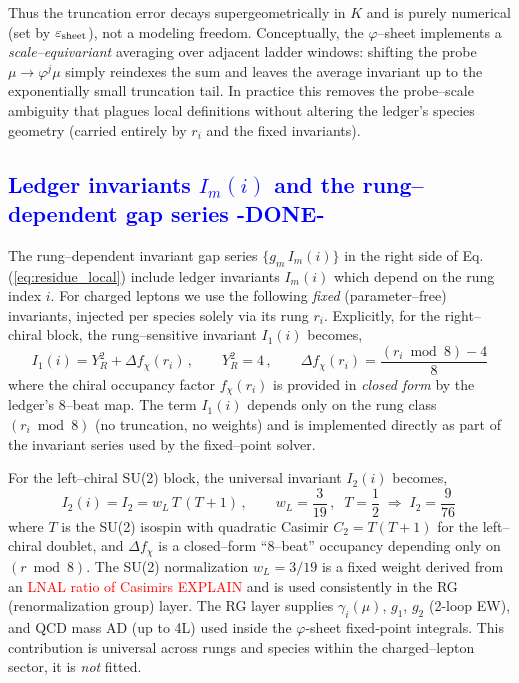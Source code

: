 \documentclass[%
 amsmath,amssymb,
 aps,
prb,
floatfix, showkeys
]{revtex4-2}
\newcommand{\need}[1]{\textcolor{red}{#1}}
\newcommand{\modif}[1]{\textcolor{blue}{#1}}
\begin{document}
Thus the truncation error decays supergeometrically in $K$ and is purely numerical
(set by $\varepsilon_{\rm sheet}$), not a modeling freedom.
Conceptually, the $\varphi$--sheet implements a \emph{scale–equivariant} averaging over
adjacent ladder windows: shifting the probe $\mu\!\to\!\varphi^j\mu$ simply reindexes
the sum and leaves the average invariant up to the exponentially small truncation tail.
In practice this removes the probe--scale ambiguity that plagues local definitions without
altering the ledger’s species geometry (carried entirely by $r_i$ and the fixed invariants).















{\modif{
\subsection{Ledger invariants $I_m(i)$ and the rung–dependent gap series  -DONE-}
\label{subsec:ledger-invariants}
}}
The rung--dependent invariant gap series
$\{g_m\,I_m(i)\}$ in the right side of
Eq.(\ref{eq:residue_local}) include ledger invariants $I_m(i)$ which depend on the
rung index $i$. 
For charged leptons we use the following \emph{fixed} (parameter–free) invariants,
injected per species solely via its rung $r_i$.
Explicitly, for the right--chiral block, the rung--sensitive 
invariant $I_1(i)$  becomes,
\begin{equation}
  I_1(i) =  Y_R^2  + \Delta f_\chi(r_i) \, , \qquad Y_R^2 = 4  \,, \qquad 
  \Delta f_\chi(r_i) = \frac{(r_i\bmod 8) - 4}{8} 
  \label{eq:I1_def}
\end{equation}
where the chiral occupancy factor $f_\chi(r_i)$ is provided in \emph{closed form}
by the ledger’s 8--beat map.
The term  $I_1(i)$ depends only on the rung class $(r_i\bmod 8)$
(no truncation, no weights) and is implemented directly as part of
the invariant series used by the fixed--point solver.


For the left--chiral SU(2) block, the universal invariant $I_2(i)$ becomes, 
\begin{equation}
  I_2(i)  = I_2 = w_L\,T\,(T+1) \, ,  \qquad w_L=\frac{3}{19}\,,\;\;
  T=\frac{1}{2}\;\Rightarrow\; I_2=\frac{9}{76}\,
\label{eq:I2_def}
\end{equation}
where  $T$ is the SU(2) isospin with quadratic Casimir $C_2 = T(T+1)$ for the
left–chiral doublet, and $\Delta f_\chi$ is a closed–form ``8–beat''
occupancy depending only on $(r\bmod 8)$. The SU(2) normalization $w_L=3/19$
is a fixed weight derived from an {\need{LNAL ratio of Casimirs  EXPLAIN}}
and is used consistently in the RG (renormalization group)  layer.
The RG layer supplies $\gamma_i(\mu)$, $g_1$, $g_2$ (2-loop EW), and
QCD mass AD (up to 4L) used inside the $\varphi$-sheet fixed‑point integrals.
This contribution is universal across rungs and species within the charged--lepton sector,
 it is \emph{not} fitted.
\end{document}
